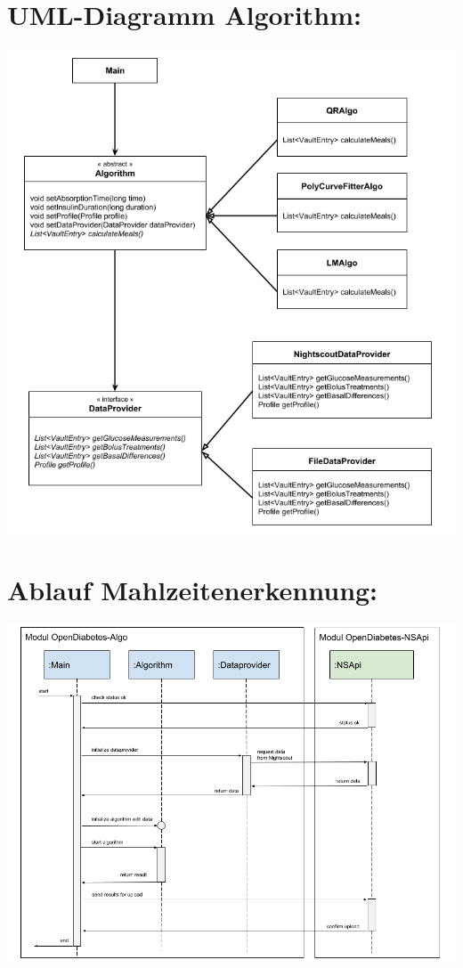 \documentclass[accentcolor=tud0b,12pt,paper=a4]{tudreport}
\begin{document}
\section*{UML-Diagramm Algorithm:}
\includegraphics[width=1\textwidth]{UMLAlgos.png}

\newpage
\section*{Ablauf Mahlzeitenerkennung:}
\includegraphics[width=1\textwidth]{SequenzdiagrammAlgorithmus.png}
\end{document}
